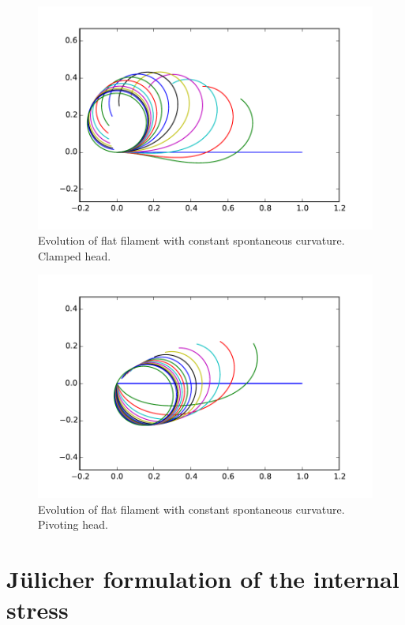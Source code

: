 \documentclass[12pt]{article}
\begin{document}
\begin{figure}
  \centering
  \includegraphics[width=\textwidth]{circle_clamped}
  \caption{Evolution of flat filament with constant spontaneous
    curvature. Clamped head.}
  \label{fig:circle-clamped}
\end{figure}

\begin{figure}
  \centering
  \includegraphics[width=\textwidth]{circle_pivoting}
  \caption{Evolution of flat filament with constant spontaneous
    curvature. Pivoting head.}
  \label{fig:circle-pivoting}
\end{figure}

\section{J\"ulicher formulation of the internal stress}
\end{document}
